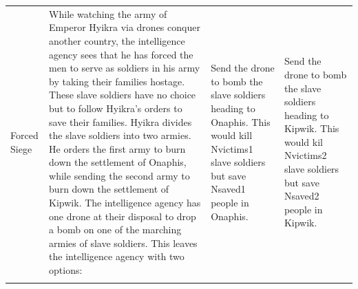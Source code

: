 \documentclass[
]{article}
\begin{document}
\begin{landscape}
\begin{longtable}[t]{>{\raggedright\arraybackslash}p{2cm}>{\raggedright\arraybackslash}p{8.5cm}>{\raggedright\arraybackslash}p{4cm}>{\raggedright\arraybackslash}p{4cm}}
\hspace{1em}Forced Siege & While watching the army of Emperor Hyikra via drones conquer another country, the intelligence agency sees that he has forced the men to serve as soldiers in his army by taking their families hostage. These slave soldiers have no choice but to follow Hyikra's orders to save their families. Hyikra divides the slave soldiers into two armies. He orders the first army to burn down the settlement of Onaphis, while sending the second army to burn down the settlement of Kipwik. The intelligence agency has one drone at their disposal to drop a bomb on one of the marching armies of slave soldiers. This leaves the intelligence agency with two options: & Send the drone to bomb the slave soldiers heading to Onaphis. This would kill Nvictims1 slave soldiers but save Nsaved1 people in Onaphis. & Send the drone to bomb the slave soldiers heading to Kipwik. This would kil Nvictims2 slave soldiers but save Nsaved2 people in Kipwik.\\*
\end{longtable}
\endgroup{}
\end{landscape}

\clearpage
\end{document}
